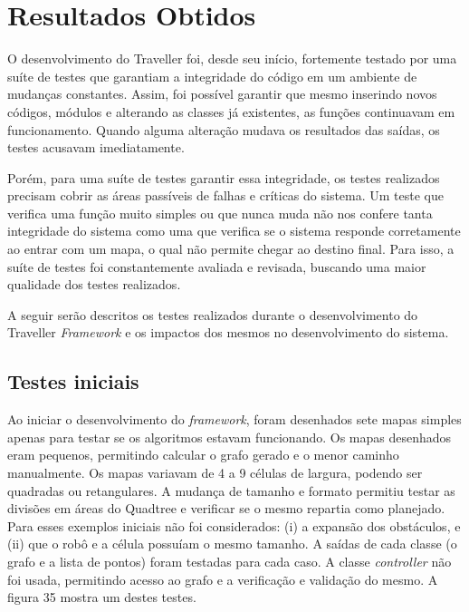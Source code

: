 \chapter[Resultados obtidos]{Resultados Obtidos}

O desenvolvimento do Traveller foi, desde seu início, fortemente testado por uma suíte de testes que garantiam a integridade do código em um ambiente de mudanças constantes. Assim, foi possível garantir que mesmo inserindo novos códigos, módulos e alterando as classes já existentes, as funções continuavam em funcionamento. Quando alguma alteração mudava os resultados das saídas, os testes acusavam imediatamente.

Porém, para uma suíte de testes garantir essa integridade, os testes realizados precisam cobrir as áreas passíveis de falhas e críticas do sistema. Um teste que verifica uma função muito simples ou que nunca muda não nos confere tanta integridade do sistema como uma que verifica se o sistema responde corretamente ao entrar com um mapa, o qual não permite chegar ao destino final. Para isso, a suíte de testes foi constantemente avaliada e revisada, buscando uma maior qualidade dos testes realizados.

A seguir serão descritos os testes realizados durante o desenvolvimento do Traveller \textit{Framework} e os impactos dos mesmos no desenvolvimento do sistema.

\section{Testes iniciais}

Ao iniciar o desenvolvimento do \textit{framework}, foram desenhados sete mapas simples apenas para testar se os algoritmos estavam funcionando. Os mapas desenhados eram pequenos, permitindo calcular o grafo gerado e o menor caminho manualmente. Os mapas variavam  de 4 a 9 células de largura, podendo ser quadradas ou retangulares. A mudança de tamanho e formato permitiu testar as divisões em áreas do Quadtree e verificar se o mesmo repartia como planejado. Para esses exemplos iniciais não foi considerados: (i) a expansão dos obstáculos, e (ii) que o robô e a célula possuíam o mesmo tamanho. A saídas de cada classe (o grafo e a lista de pontos) foram testadas para cada caso. A classe \textit{controller} não foi usada, permitindo acesso ao grafo e a verificação e validação do mesmo. A figura 35 mostra um destes testes.

